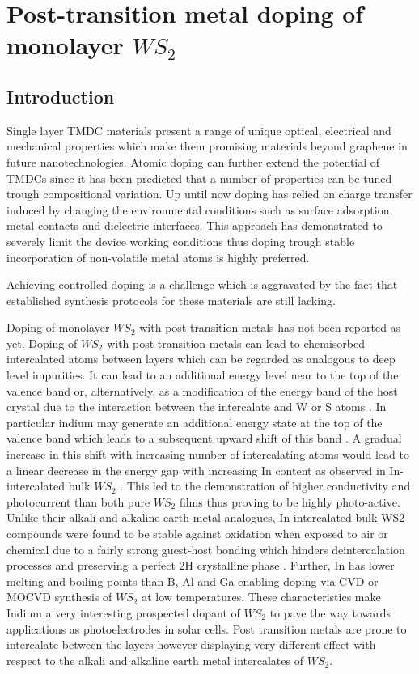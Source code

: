 \chapter{Post-transition metal doping of monolayer $WS_2$}

\section{Introduction}

Single layer TMDC materials present a range of unique optical, electrical and mechanical properties which make them promising materials beyond graphene in future nanotechnologies.
Atomic doping can further extend the potential of TMDCs since it has been predicted that a number of properties can be tuned trough compositional variation. Up until now doping has relied on charge transfer induced by changing the environmental conditions such as surface adsorption, metal contacts and dielectric interfaces. This approach has demonstrated to severely limit the device working conditions thus doping trough stable incorporation of non-volatile metal atoms is highly preferred.

Achieving controlled doping is a challenge which is aggravated by the fact that established synthesis protocols for these materials are still lacking.

Doping of monolayer $WS_2$ with post-transition metals has not been reported as yet. Doping of $WS_2$ with post-transition metals can lead to chemisorbed intercalated atoms between layers which can be regarded as analogous to deep level impurities. It can lead to an additional energy level near to the top of the valence band or, alternatively, as a modification of the energy band of the host crystal due to the interaction between the intercalate and W or S atoms \cite{Yacobi1979}\cite{Yacobi1979a}. In particular indium may generate an additional energy state at the top of the valence band which leads to a subsequent upward shift of this band \cite{Deshpande2001}. A gradual increase in this shift with increasing number of intercalating atoms would lead to a linear decrease in the energy gap with increasing In content as observed in In-intercalated bulk $WS_2$ \cite{Deshpande2001}. This led to the demonstration of higher conductivity and photocurrent than both pure $WS_2$ films thus proving to be highly photo-active. Unlike their alkali and alkaline earth metal analogues, In-intercalated bulk WS2 compounds were found to be stable against oxidation when exposed to air or chemical due to a fairly strong guest-host bonding which hinders deintercalation processes and preserving a perfect 2H crystalline phase \cite{Deshpande2001}\cite{Rao1981}. Further, In has lower melting and boiling points than B, Al and Ga enabling doping via CVD or MOCVD synthesis of $WS_2$ at low temperatures. These characteristics make Indium a very interesting prospected dopant of $WS_2$ to pave the way towards applications as photoelectrodes in solar cells. Post transition metals are prone to intercalate between the layers however displaying very different effect with respect to the alkali and alkaline earth metal intercalates of $WS_2$.

